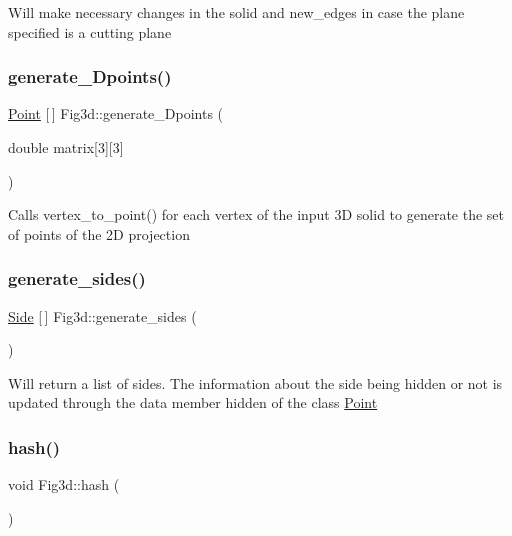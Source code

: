 Will make necessary changes in the solid and new\+\_\+edges in case the plane specified is a cutting plane \mbox{\label{class_fig3d_a44d92006b733d19d899496657bca9729}} 
\subsubsection{\texorpdfstring{generate\+\_\+Dpoints()}{generate\_2Dpoints()}}
{\footnotesize\ttfamily \mbox{\hyperlink{class_point}{Point}} \mbox{[}$\,$\mbox{]} Fig3d\+::generate\+\_\+Dpoints (\begin{DoxyParamCaption}\item[{double}]{matrix\mbox{[}3\mbox{]}\mbox{[}3\mbox{]} }\end{DoxyParamCaption})}

Calls vertex\+\_\+to\+\_\+point() for each vertex of the input 3D solid to generate the set of points of the 2D projection \mbox{\label{class_fig3d_afef51436c82aae83ce95314e3ca36e06}} 
\subsubsection{\texorpdfstring{generate\+\_\+sides()}{generate\_sides()}}
{\footnotesize\ttfamily \mbox{\hyperlink{class_side}{Side}} \mbox{[}$\,$\mbox{]} Fig3d\+::generate\+\_\+sides (\begin{DoxyParamCaption}{ }\end{DoxyParamCaption})}

Will return a list of sides. The information about the side being hidden or not is updated through the data member hidden of the class \mbox{\hyperlink{class_point}{Point}} \mbox{\label{class_fig3d_ac8c3a1dc754f382f22ec2dac6dc16f4f}} 
\subsubsection{\texorpdfstring{hash()}{hash()}}
{\footnotesize\ttfamily void Fig3d\+::hash (\begin{DoxyParamCaption}{ }\end{DoxyParamCaption})}

